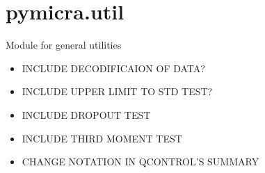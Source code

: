 \documentclass[a4paper,10pt,oneside]{sphinxmanual}
\begin{document}
\section{pymicra.util}
\label{pymicra:pymicra-util}\label{pymicra:module-pymicra.util}
Module for general utilities
\begin{itemize}
\item {} 
INCLUDE DECODIFICAION OF DATA?

\item {} 
INCLUDE UPPER LIMIT TO STD TEST?

\item {} 
INCLUDE DROPOUT TEST

\item {} 
INCLUDE THIRD MOMENT TEST

\item {} 
CHANGE NOTATION IN QCONTROL'S SUMMARY

\end{itemize}
\end{document}

